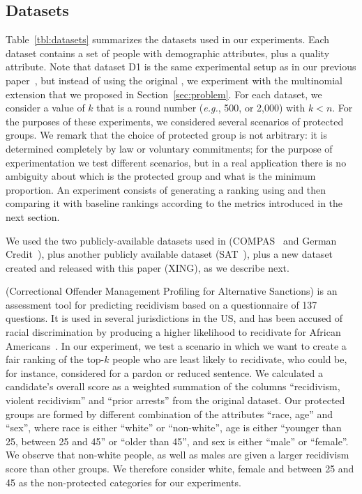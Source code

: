 \subsection{Datasets}\label{sec:experiments-datasets}

Table~\ref{tbl:datasets} summarizes the datasets used in our experiments.
%
Each dataset contains a set of people with demographic attributes, plus a quality attribute.
%
Note that dataset D1 is the same experimental setup as in our previous paper~\cite{zehlike2017fair}, but instead of using the original \algoFAIR, we experiment with the multinomial extension that we proposed in Section~\ref{sec:problem}.
%
For each dataset, we consider a value of $k$ that is a round number ({\em e.g.}, 500, or 2,000) with $k<n$.
%
For the purposes of these experiments, we considered several scenarios of protected groups.
%
We remark that the choice of protected group is not arbitrary: it is determined completely by law or voluntary commitments; for the purpose of experimentation we test different scenarios, but in a real application there is no ambiguity about which is the protected group and what is the minimum proportion.
%
An experiment consists of generating a ranking using \algoFAIR and then comparing it with baseline rankings according to the metrics introduced in the next section.

We used the two publicly-available datasets used in \cite{yang2016measuring} (COMPAS~\cite{angwin_2016_machine} and German Credit~\cite{lichman_2013_uci}), plus another publicly available dataset (SAT~\cite{sat_2014}), plus a new dataset created and released with this paper (XING), as we describe next.

 (Correctional Offender Management Profiling for Alternative Sanctions) is an assessment tool for predicting recidivism based on a questionnaire of 137 questions. It is used in several jurisdictions in the US, and has been accused of racial discrimination by producing a higher likelihood to recidivate for African Americans~\cite{angwin_2016_machine}.
%
In our experiment, we test a scenario in which we want to create a fair ranking of the top-$k$ people who are least likely to recidivate, who could be, for instance, considered for a pardon or reduced sentence.
%
We calculated a candidate's overall score as a weighted summation of the columns ``recidivism, violent recidivism'' and ``prior arrests'' from the original dataset.
%
Our protected groups are formed by different combination of the attributes ``race, age'' and ``sex'', where race is either ``white'' or ``non-white'', age is either ``younger than 25, between 25 and 45'' or ``older than 45'', and sex is either ``male'' or ``female''.
%
We observe that non-white people, as well as males are given a larger recidivism score than other groups.
%
We therefore consider white, female and between 25 and 45 as the non-protected categories for our experiments.

